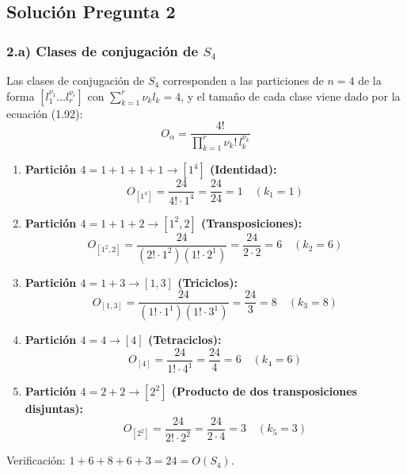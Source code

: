 \documentclass[11pt, a4paper]{article}
\begin{document}
\subsection*{Solución Pregunta 2}

\subsubsection*{2.a) Clases de conjugación de $S_4$}
Las clases de conjugación de $S_4$ corresponden a las particiones de $n = 4$ de la forma $[l_1^{\nu_1} \dots l_r^{\nu_r}]$ con $\sum_{k=1}^r \nu_k l_k = 4$, y el tamaño de cada clase viene dado por la ecuación (1.92):
\[
O_\alpha = \frac{4!}{\prod_{k=1}^r \nu_k! \, l_k^{\nu_k}}
\]
\begin{enumerate}
    \item \textbf{Partición $4 = 1 + 1 + 1 + 1 \to [1^4]$ (Identidad):}
    \[
    O_{[1^4]} = \frac{24}{4! \cdot 1^4} = \frac{24}{24} = 1 \quad (k_1 = 1)
    \]
    \item \textbf{Partición $4 = 1 + 1 + 2 \to [1^2, 2]$ (Transposiciones):}
    \[
    O_{[1^2, 2]} = \frac{24}{(2! \cdot 1^2)(1! \cdot 2^1)} = \frac{24}{2 \cdot 2} = 6 \quad (k_2 = 6)
    \]
    \item \textbf{Partición $4 = 1 + 3 \to [1, 3]$ (Triciclos):}
    \[
    O_{[1, 3]} = \frac{24}{(1! \cdot 1^1)(1! \cdot 3^1)} = \frac{24}{3} = 8 \quad (k_3 = 8)
    \]
    \item \textbf{Partición $4 = 4 \to [4]$ (Tetraciclos):}
    \[
    O_{[4]} = \frac{24}{1! \cdot 4^1} = \frac{24}{4} = 6 \quad (k_4 = 6)
    \]
    \item \textbf{Partición $4 = 2 + 2 \to [2^2]$ (Producto de dos transposiciones disjuntas):}
    \[
    O_{[2^2]} = \frac{24}{2! \cdot 2^2} = \frac{24}{2 \cdot 4} = 3 \quad (k_5 = 3)
    \]
\end{enumerate}
Verificación: $1 + 6 + 8 + 6 + 3 = 24 = O(S_4)$.
\end{document}
